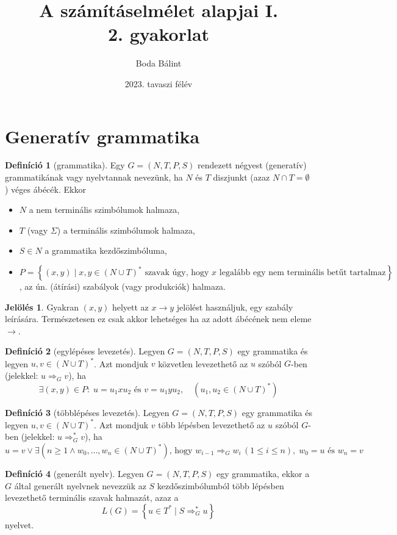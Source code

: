 \documentclass[a4paper,12pt]{article}
\title{\huge{A számításelmélet alapjai I.} \\[-4pt] \large 2. gyakorlat \vspace{-15pt}}
\author{Boda Bálint}
\date{\vspace{-12pt}2023. tavaszi félév}
\theoremstyle{definition}
\newtheorem*{definition*}{Definíció}
\newtheorem*{notation*}{Jelölés}
\begin{document}
	\maketitle
	\vspace{-10pt}
	
	\section{Generatív grammatika}
	\begin{definition*}[grammatika]
		Egy $ G = (N, T, P, S) $ rendezett négyest (generatív) grammatikának vagy nyelvtannak nevezünk, ha $N$ és $T$ diszjunkt (azaz $N \cap T = \emptyset $) véges ábécék. Ekkor 
		\begin{itemize}
			\item $N$ a nem terminális szimbólumok halmaza,
			\item $T$ (vagy $ \Sigma $) a terminális szimbólumok halmaza,
			\item $S \in N$ a grammatika kezdőszimbóluma,
			\item $P = \left\lbrace (x,y) \; | \; x,y \in \left( N \cup T \right)^*  \text{ szavak úgy, hogy } x \text{ legalább egy nem terminális betűt tartalmaz} \right\rbrace $, az ún. (átírási) szabályok (vagy produkciók) halmaza.
		\end{itemize}
	\end{definition*}

	\begin{notation*}
		Gyakran $(x,y)$ helyett az $x \rightarrow y$ jelölést használjuk, egy szabály leírására. Természetesen ez csak akkor lehetséges ha az adott ábécének nem eleme $\rightarrow$. 
	\end{notation*}
	\vspace{6pt}
	\begin{definition*}[egylépéses levezetés]
		Legyen $ G = (N, T, P, S) $ egy grammatika és legyen $u, v \in (N \cup T)^*$. Azt mondjuk $v$ közvetlen levezethető az $u$ szóból $G$-ben (jelekkel: $ u \Rightarrow_G v $), ha
		\[
		\exists (x, y) \in P: \; u = u_1xu_2 \text{ és } v = u_1yu_2, \quad \left(u_1, u_2 \in (N \cup T)^*\right)
		\]  
	\end{definition*}
	\vspace{6pt}
	\begin{definition*}[többlépéses levezetés]
		Legyen $ G = (N, T, P, S) $ egy grammatika és legyen $u, v \in (N \cup T)^*$. Azt mondjuk $v$ több lépésben levezethető az $u$ szóból $G$-ben (jelekkel: $ u \Rightarrow_G^* v $), ha
		\[
		u = v \lor \exists \left( n \ge 1 \land w_0,\dots,w_n \in (N \cup T)^* \right)  \text{, hogy } w_{i-1} \Rightarrow_G w_i \, (1 \le i \le n), \; w_0 = u \text{ és } w_n = v
		\]
	\end{definition*}
	\vspace{6pt}
	\begin{definition*}[generált nyelv]
		Legyen $ G = (N, T, P, S) $ egy grammatika, ekkor a $G$ által generált nyelvnek nevezzük az $S$ kezdőszimbólumból több lépésben levezethető terminális szavak halmazát, azaz a
		\[
			L(G) = \left\lbrace u \in T^* \; | \; S \Rightarrow_G^* u \right\rbrace 
		\]
		nyelvet.
	\end{definition*}
\end{document}
